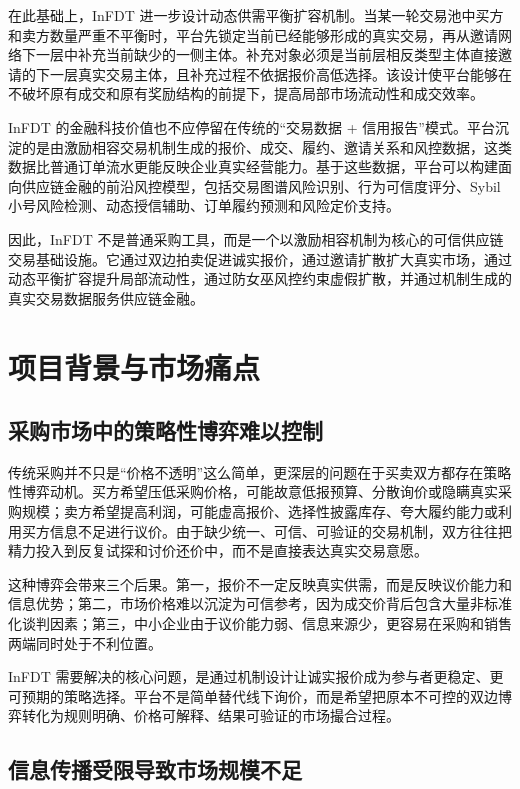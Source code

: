 \documentclass[UTF8,11pt]{ctexart}
\begin{document}
在此基础上，InFDT 进一步设计动态供需平衡扩容机制。当某一轮交易池中买方和卖方数量严重不平衡时，平台先锁定当前已经能够形成的真实交易，再从邀请网络下一层中补充当前缺少的一侧主体。补充对象必须是当前层相反类型主体直接邀请的下一层真实交易主体，且补充过程不依据报价高低选择。该设计使平台能够在不破坏原有成交和原有奖励结构的前提下，提高局部市场流动性和成交效率。

InFDT 的金融科技价值也不应停留在传统的“交易数据 + 信用报告”模式。平台沉淀的是由激励相容交易机制生成的报价、成交、履约、邀请关系和风控数据，这类数据比普通订单流水更能反映企业真实经营能力。基于这些数据，平台可以构建面向供应链金融的前沿风控模型，包括交易图谱风险识别、行为可信度评分、Sybil 小号风险检测、动态授信辅助、订单履约预测和风险定价支持。

因此，InFDT 不是普通采购工具，而是一个以激励相容机制为核心的可信供应链交易基础设施。它通过双边拍卖促进诚实报价，通过邀请扩散扩大真实市场，通过动态平衡扩容提升局部流动性，通过防女巫风控约束虚假扩散，并通过机制生成的真实交易数据服务供应链金融。

\newpage

\section{项目背景与市场痛点}

\subsection{采购市场中的策略性博弈难以控制}

传统采购并不只是“价格不透明”这么简单，更深层的问题在于买卖双方都存在策略性博弈动机。买方希望压低采购价格，可能故意低报预算、分散询价或隐瞒真实采购规模；卖方希望提高利润，可能虚高报价、选择性披露库存、夸大履约能力或利用买方信息不足进行议价。由于缺少统一、可信、可验证的交易机制，双方往往把精力投入到反复试探和讨价还价中，而不是直接表达真实交易意愿。

这种博弈会带来三个后果。第一，报价不一定反映真实供需，而是反映议价能力和信息优势；第二，市场价格难以沉淀为可信参考，因为成交价背后包含大量非标准化谈判因素；第三，中小企业由于议价能力弱、信息来源少，更容易在采购和销售两端同时处于不利位置。

InFDT 需要解决的核心问题，是通过机制设计让诚实报价成为参与者更稳定、更可预期的策略选择。平台不是简单替代线下询价，而是希望把原本不可控的双边博弈转化为规则明确、价格可解释、结果可验证的市场撮合过程。

\subsection{信息传播受限导致市场规模不足}
\end{document}
